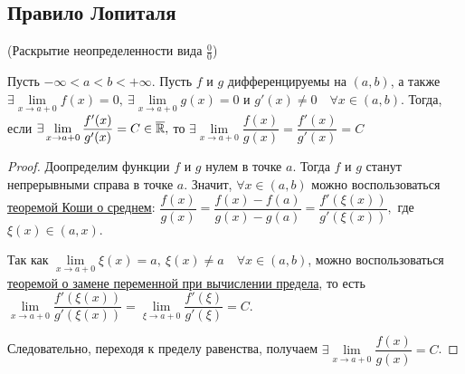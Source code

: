 \subsection{Правило Лопиталя}
\begin{theorem}
	\hypertarget{thrm5.19}{(Раскрытие неопределенности вида $\frac{0}{0}$)}
	Пусть $-\infty < a< b< +\infty$. Пусть $f$ и $g$ дифференцируемы на $(a,b)$, а также $\exists \lim\limits_{x\to a+0} f(x) = 0, \ \exists \lim\limits_{x\to a+0} g(x) = 0$ и $g'(x) \neq 0 \quad \forall x \in (a,b)$. Тогда, если $\exists \lim\limits_{x\to a+0} \dfrac{f'(x)}{g'(x)} = C\in \overline{\mathbb{R}},$ то $\exists \lim\limits_{x\to a+0} \dfrac{f(x)}{g(x)} =\dfrac{f'(x)}{g'(x)} =C$
\end{theorem}
\begin{proof}Доопределим функции $f$ и $g$ нулем в точке $a$. Тогда $f$ и $g$ станут непрерывными справа в точке $a.$ Значит, $\forall x \in (a, b)$ можно воспользоваться \hyperlink{thrm6.3}{теоремой Коши о среднем}: 	$\dfrac{f(x)}{g(x)} = \dfrac{f(x) - f(a)}{g(x) - g(a)} = \dfrac{f'(\xi(x))}{g'(\xi(x))},$ где $\xi(x) \in (a, x).$
	
	Так как $\lim\limits_{x\to a+0}\xi (x) = a, \ \xi(x) \neq a \quad \forall x \in (a, b)$, можно воспользоваться \hyperlink{thrm4.18}{теоремой о замене переменной при вычислении предела}, то есть $\lim\limits_{x\to a+0}\dfrac{f'(\xi(x))}{g'(\xi(x))} = \lim\limits_{\xi\to a+0} \dfrac{f'(\xi)}{g'(\xi)} = C.$
	
	Следовательно, переходя к пределу равенства, получаем $\exists \lim\limits_{x\to a+0} \dfrac{f(x)}{g(x)} = C$.
\end{proof}

